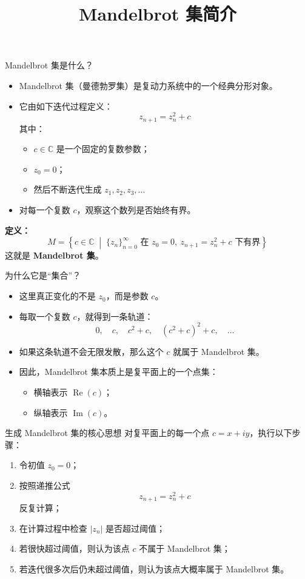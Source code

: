 \documentclass[UTF8]{ctexbeamer}
\title{Mandelbrot 集简介}
\author{}
\date{}
\begin{document}
\frame{\titlepage}

\begin{frame}{Mandelbrot 集是什么？}
\begin{itemize}
    \item Mandelbrot 集（曼德勃罗集）是复动力系统中的一个经典分形对象。
    \item 它由如下迭代过程定义：
    \[
        z_{n+1} = z_n^2 + c
    \]
    其中：
    \begin{itemize}
        \item \(c \in \mathbb{C}\) 是一个固定的复数参数；
        \item \(z_0 = 0\)；
        \item 然后不断迭代生成 \(z_1, z_2, z_3, \dots\)
    \end{itemize}
    \item 对每一个复数 \(c\)，观察这个数列是否始终有界。
\end{itemize}

\medskip
\textbf{定义：}
\[
M = \left\{ c \in \mathbb{C} \;\middle|\; \{z_n\}_{n=0}^{\infty} \text{ 在 } z_0=0,\ z_{n+1}=z_n^2+c \text{ 下有界} \right\}
\]
这就是 \textbf{Mandelbrot 集}。
\end{frame}

\begin{frame}{为什么它是“集合”？}
\begin{itemize}
    \item 这里真正变化的不是 \(z_0\)，而是参数 \(c\)。
    \item 每取一个复数 \(c\)，就得到一条轨道：
    \[
    0,\quad c,\quad c^2+c,\quad (c^2+c)^2+c,\quad \dots
    \]
    \item 如果这条轨道不会无限发散，那么这个 \(c\) 就属于 Mandelbrot 集。
    \item 因此，Mandelbrot 集本质上是复平面上的一个点集：
    \begin{itemize}
        \item 横轴表示 \(\operatorname{Re}(c)\)；
        \item 纵轴表示 \(\operatorname{Im}(c)\)。
    \end{itemize}
\end{itemize}
\end{frame}

\begin{frame}{生成 Mandelbrot 集的核心思想}
对复平面上的每一个点 \(c=x+iy\)，执行以下步骤：

\begin{enumerate}
    \item 令初值 \(z_0 = 0\)；
    \item 按照递推公式
    \[
        z_{n+1}=z_n^2+c
    \]
    反复计算；
    \item 在计算过程中检查 \(|z_n|\) 是否超过阈值；
    \item 若很快超过阈值，则认为该点 \(c\) 不属于 Mandelbrot 集；
    \item 若迭代很多次后仍未超过阈值，则认为该点大概率属于 Mandelbrot 集。
\end{enumerate}
\end{frame}
\end{document}
